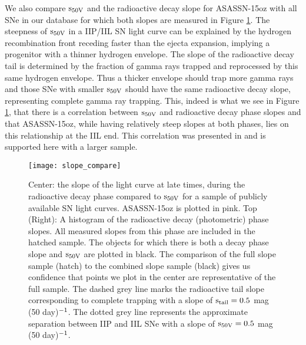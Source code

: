 \documentclass[a4paper,fleqn,usenatbib]{mnras}
\begin{document}
We also compare $\rm{s_{50V}}$ and the radioactive decay slope  for ASASSN-15oz with all SNe in our database for which both slopes are measured in Figure \ref{fig:SlopeComp}.
The steepness of $\rm{s_{50V}}$ in a IIP/IIL SN light curve can be explained by the hydrogen recombination front receding faster than the ejecta expansion, implying a progenitor with a thinner hydrogen envelope.
The slope of the radioactive decay tail is determined by the fraction of gamma rays trapped and reprocessed by this same hydrogen envelope.
Thus a thicker envelope should trap more gamma rays and those SNe with smaller $\rm{s_{50V}}$ should have the same radioactive decay slope, representing complete gamma ray trapping.
This, indeed is what we see in Figure \ref{fig:SlopeComp}, that there is a correlation between $\rm{s_{50V}}$  and radioactive decay phase slopes and that ASASSN-15oz, while having relatively steep slopes at both phases, lies on this relationship at the IIL end.
This correlation was presented in \citet{2014anderson} and is supported here with a larger sample.
\begin{figure}
\begin{center}
\texttt{[image: slope\_compare]} %
\caption{Center: the slope of the light curve at late times, during the radioactive decay phase compared to $\rm{s_{50V}}$ for a sample of publicly available SN light curves.
ASASSN-15oz is plotted in pink.
Top (Right): A histogram of the radioactive decay (photometric) phase slopes. All measured slopes from this phase are included in the hatched sample.
The objects for which there is both a decay phase slope and $\rm{s_{50V}}$  are plotted in black. The comparison of the full slope sample (hatch) to the combined slope sample (black) gives us confidence that points we plot in the center are representative of the full sample. 
The dashed grey line marks the radioactive tail slope corresponding to complete trapping with a slope of $\rm{s_{tail} = 0.5}$ mag (50 day)$\rm{^{-1}}$.
The dotted grey line represents the approximate separation between IIP and IIL SNe with a slope of $\rm{s_{50V}=0.5}$ mag (50 day)$\rm{^{-1}}$. 
 }
\label{fig:SlopeComp}
\end{center}
\end{figure}
\end{document}
